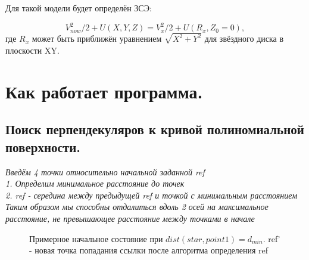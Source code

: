 \documentclass[a4paper,12pt]{article}
\begin{document}
Для такой модели будет определён ЗСЭ:

\begin{equation}
	V_{now}^2/2 + U(X, Y, Z) = V_{x}^2/2 + U(R_x, Z_0 = 0),
\end{equation}
где $R_x$ может быть приближён уравнением $\sqrt{X^2 + Y^2}$ для звёздного диска в плоскости XY.


\section{Как работает программа.}
\subsection{Поиск перпендекуляров к кривой полиномиальной поверхности.}

\textit{Введём 4 точки относительно начальной заданной ref}\\
\textit{1. Определим минимальное расстояние до точек} \\
\textit{2. ref - середина между предыдущей ref и точкой с минимальным расстоянием} \\
\textit{Таким образом мы способны отдалиться вдоль 2 осей на максимальное расстояние, не превышающее расстояние между точками в начале}


\begin{figure}[h]
	\centering
	\caption{Примерное начальное состояние при $dist(star, point1) = d_{min}$. ref' - новая точка попадания ссылки после алгоритма определения ref}
	\label{fig:points}
\end{figure}
\end{document}
